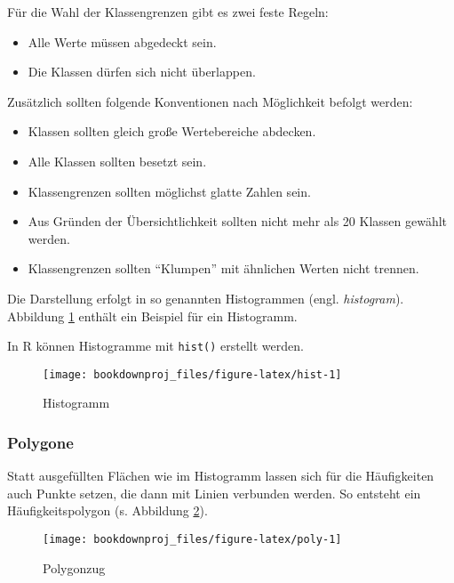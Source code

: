 \documentclass[
  ngerman,
]{article}
\providecommand{\tightlist}{%
  \setlength{\itemsep}{0pt}\setlength{\parskip}{0pt}}
\begin{document}
Für die Wahl der Klassengrenzen gibt es zwei feste Regeln:

\begin{itemize}
\tightlist
\item
  Alle Werte müssen abgedeckt sein.
\item
  Die Klassen dürfen sich nicht überlappen.
\end{itemize}

Zusätzlich sollten folgende Konventionen nach Möglichkeit befolgt werden:

\begin{itemize}
\tightlist
\item
  Klassen sollten gleich große Wertebereiche abdecken.
\item
  Alle Klassen sollten besetzt sein.
\item
  Klassengrenzen sollten möglichst glatte Zahlen sein.
\item
  Aus Gründen der Übersichtlichkeit sollten nicht mehr als 20 Klassen gewählt werden.
\item
  Klassengrenzen sollten ``Klumpen'' mit ähnlichen Werten nicht trennen.
\end{itemize}

Die Darstellung erfolgt in so genannten Histogrammen (engl. \emph{histogram}). Abbildung \ref{fig:hist} enthält ein Beispiel für ein Histogramm.

\begin{rtip}
In R können Histogramme mit {\tt hist()} erstellt werden.
\end{rtip}

\begin{figure}[h]

{\centering \texttt{[image: bookdownproj\_files/figure-latex/hist-1]} 

}

\caption{Histogramm}\label{fig:hist}
\end{figure}

\hypertarget{polygone}{%
\subsubsection{Polygone}\label{polygone}}

Statt ausgefüllten Flächen wie im Histogramm lassen sich für die Häufigkeiten auch Punkte setzen, die dann mit Linien verbunden werden. So entsteht ein Häufigkeitspolygon (s. Abbildung \ref{fig:poly}).

\begin{figure}[h]

{\centering \texttt{[image: bookdownproj\_files/figure-latex/poly-1]} 

}

\caption{Polygonzug}\label{fig:poly}
\end{figure}
\end{document}
